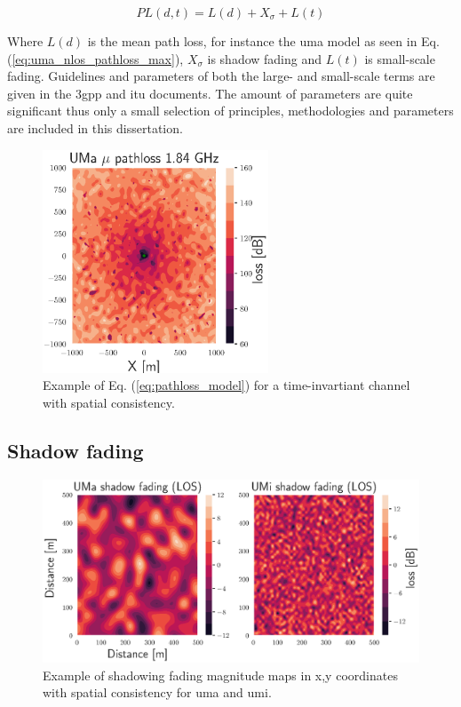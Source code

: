 \begin{equation}\label{eq:pathloss_model}
  PL(d,t) = L(d) + X_\sigma + L(t)
\end{equation}

Where $L(d)$ is the mean path loss, for instance the \gls{uma} model as seen in Eq. (\ref{eq:uma_nlos_pathloss_max}), $X_\sigma$ is shadow fading and $L(t)$ is small-scale fading. Guidelines and parameters of both the large- and small-scale terms are given in the \gls{3gpp} and \gls{itu} documents. The amount of parameters are quite significant thus only a small selection of principles, methodologies and parameters are included in this dissertation. 

\begin{figure}
    \centering
    \includegraphics[width=0.6\textwidth]{chapters/part_pathloss/figures/UMaPL.eps}
    \caption{Example of Eq. (\ref{eq:pathloss_model}) for a time-invartiant channel with spatial consistency.}
\end{figure}


\subsection{Shadow fading}
\begin{figure}
    \centering
    \includegraphics{chapters/part_pathloss/figures/UMaUMiShadowFadingMapLOS.eps}
    \caption{Example of shadowing fading magnitude maps in x,y coordinates with spatial consistency for \gls{uma} and \gls{umi}.}
    \label{fig:uma_umi_shadow_fading_example}
\end{figure}

